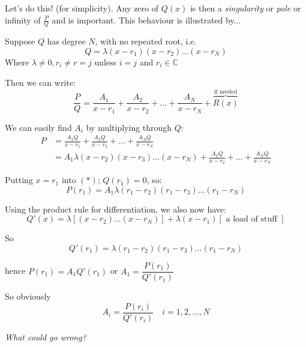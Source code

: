 \documentclass[10pt]{scrartcl}
\begin{document}
Let's do this! (for simplicity). Any zero of $Q(x)$ is then a \emph{singularity} or \emph{pole} or infinity of $\frac{P}{Q}$ and is important. This behaviour is illustrated by...\\



Suppose $Q$ has degree $N$, with no repeated root, i.e.
\[Q = \lambda (x-r_1)(x-r_2)\dots(x-r_N)\] 
Where $\lambda \neq 0, r_i \neq r=j$ unless $i = j$ and $r_i \in \mathbb{C}$

Then we can write:
\[\frac{P}{Q} = \frac{A_1}{x-r_1} + \frac{A_2}{x-r_2} + \dots + \frac{A_N}{x-r_N} + \overbrace{R(x)}^\text{if needed} \]

We can easily find $A_i$ by multiplying through $Q$:\vspace*{5pt}
\begin{align} \nonumber P &= \frac{A_1Q}{x-r_1} + \frac{A_2Q}{x-r_2} + \dots + \frac{A_NQ}{x-r_N}\\ \nonumber
&= A_1 \lambda(x-r_2)(x-r_3)\dots(x-r_N) + \frac{A_2Q}{x-r_2} + \dots + \frac{A_NQ}{x-r_N}  \tag{$*$}
\end{align}

Putting $x = r_1$ into $(*)$; $Q(r_1) = 0$, so:\vspace*{5pt}
\[P(r_1) = A_1 \lambda (r_1 - r_2)(r_1 - r_3)\dots(r_1 - r_N) \]

Using the product rule for differentiation, we also now have:
\[
Q'(x) = \lambda[(x-r_2)\dots(x-r_N)] + \lambda(x-r_1)[\text{ a load of stuff }]
\]

So \[Q'(r_1) = \lambda(r_1-r_2)(r_1-r_3)\dots(r_1-r_N)\] 

hence $P(r_1) = A_1Q'(r_1)$ or $A_1 = \dfrac{P(r_1)}{Q'(r_1)}$

So obviously \[\boxed{A_i = \dfrac{P(r_i)}{Q'(r_i)} \quad i = 1,2,...,N}\]\vspace*{5pt}

\emph{What could go wrong?}
\end{document}
